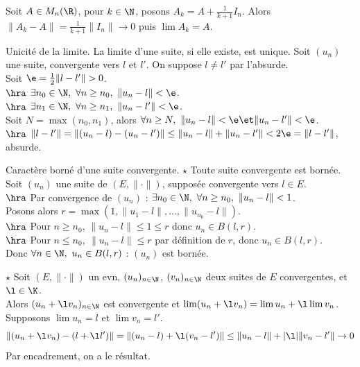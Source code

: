 \documentclass[11pt]{article}
\begin{document}
\vspace*{-0.8cm}

\begin{ex}{}{}
    Soit $A\in M_n(\R)$, pour $k\in\N$, posons $A_k=A+\frac{1}{k+1}I_n$. Alors $\|A_k-A\|=\frac{1}{k+1}\|I_n\|\to 0$ puis $\lim A_k = A$.
\end{ex}

\vspace*{-0.8cm}

\begin{prop}{Unicité de la limite.}{}
    La limite d'une suite, si elle existe, est unique.
    \tcblower
    Soit $(u_n)$ une suite, convergente vers $l$ et $l'$. On suppose $l\neq l'$ par l'absurde.\\
    Soit $\e=\frac{1}{2}\|l-l'\| > 0$.\\
    $\hra$ $\exists n_0 \in \N, ~ \forall n \geq n_0, ~ \|u_n-l\|<\e$.\\
    $\hra$ $\exists n_1 \in \N, ~ \forall n \geq n_1, ~ \|u_n-l'\|<\e$.\\
    Soit $N = \max(n_0,n_1)$, alors $\forall n \geq N, ~ \|u_n-l\| < \e \et \|u_n-l'\|<\e$.\\
    $\hra$ $\|l-l'\| = \|(u_n - l) - (u_n - l')\| \leq \|u_n - l\| + \|u_n - l'\| < 2\e = \|l-l'\|$, absurde.
\end{prop}

\vspace*{-0.4cm}

\begin{thm}{Caractère borné d'une suite convergente. $\star$}{}
    Toute suite convergente est bornée.
    \tcblower
    Soit $(u_n)$ une suite de $(E,\|\cdot\|)$, supposée convergente vers $l\in E$.\\
    $\hra$ Par convergence de $(u_n)$ : $\exists n_0 \in \N, ~ \forall n \geq n_0, ~ \|u_n - l\| < 1$.\\
    Posons alors $r=\max(1,\|u_1-l\|,...,\|u_{n_0}-l\|)$.\\
    $\hra$ Pour $n\geq n_0$, $\|u_n - l\| \leq 1\leq r$ donc $u_n\in B(l,r)$.\\
    $\hra$ Pour $n\leq n_0, ~ \|u_n - l\|\leq r$ par définition de $r$, donc $u_n\in B(l,r)$.\\
    Donc $\forall n \in \N, ~ u_n \in B(l,r)$ : $(u_n)$ est bornée.
\end{thm}

\vspace*{-0.4cm}

\begin{prop}{$\star$}{}
    Soit $(E,\|\cdot\|)$ un evn, $(u_n)_{n\in\N}$, $(v_n)_{n\in\N}$ deux suites de $E$ convergentes, et $\l\in\K$.\\
    Alors $(u_n + \l v_n)_{n\in\N}$ est convergente et $\lim(u_n + \l v_n)=\lim u_n + \l \lim v_n$.
    \tcblower
    Supposons $\lim u_n = l$ et $\lim v_n = l'$.
    \begin{equation*}
        \|(u_n + \l v_n) - (l + \l l')\| = \|(u_n - l) + \l(v_n - l')\| \leq \|u_n - l\| + |\l|\|v_n - l'\| \to 0
    \end{equation*}
    Par encadrement, on a le résultat.
\end{prop}
\end{document}
